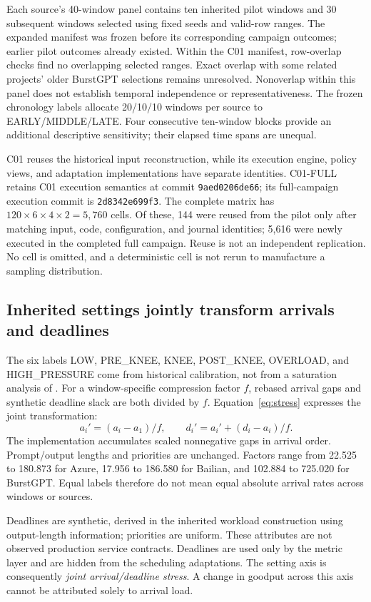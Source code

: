 Each source's 40-window panel contains ten inherited pilot windows and 30
subsequent windows selected using fixed seeds and valid-row ranges. The
expanded manifest was frozen before its corresponding campaign outcomes;
earlier pilot outcomes already existed. Within the C01 manifest, row-overlap
checks find no overlapping selected ranges. Exact overlap with some related
projects' older BurstGPT selections remains unresolved. Nonoverlap within
this panel does not establish temporal independence or representativeness.
The frozen chronology labels allocate 20/10/10 windows per source to
EARLY/MIDDLE/LATE. Four consecutive ten-window blocks provide an additional
descriptive sensitivity; their elapsed time spans are unequal.

C01 reuses the historical input reconstruction, while its execution engine,
policy views, and adaptation implementations have separate identities.
C01-FULL retains C01 execution semantics at commit \texttt{9aed0206de66};
its full-campaign execution commit is \texttt{2d8342e699f3}.
The complete matrix has
$120\times6\times4\times2=5,760$ cells. Of these, 144 were reused from the
pilot only after matching input, code, configuration, and journal identities;
5,616 were newly executed in the completed full campaign. Reuse is not an
independent replication. No cell is omitted, and a deterministic cell is
not rerun to manufacture a sampling distribution.

\subsection{Inherited settings jointly transform arrivals and deadlines}
The six labels LOW, PRE\_KNEE, KNEE, POST\_KNEE, OVERLOAD, and HIGH\_PRESSURE
come from historical calibration, not from a saturation analysis of \cm.
For a window-specific compression factor $f$, rebased arrival gaps and
synthetic deadline slack are both divided by $f$. Equation~\ref{eq:stress} expresses the joint transformation:
\begin{equation}\label{eq:stress}
 a_i'=(a_i-a_1)/f,\qquad d_i'=a_i'+(d_i-a_i)/f.
\end{equation}
The implementation accumulates scaled nonnegative gaps in arrival order.
Prompt/output lengths and priorities are unchanged. Factors range from
22.525 to 180.873 for Azure, 17.956 to 186.580 for Bailian, and 102.884 to
725.020 for BurstGPT. Equal labels therefore do not mean equal absolute
arrival rates across windows or sources.

Deadlines are synthetic, derived in the inherited workload construction
using output-length information; priorities are uniform. These attributes
are not observed production service contracts. Deadlines are used only by
the metric layer and are hidden from the scheduling adaptations. The
setting axis is consequently \emph{joint arrival/deadline stress}. A change
in goodput across this axis cannot be attributed solely to arrival load.

